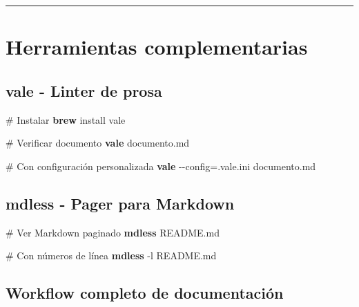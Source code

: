 \documentclass[
  11pt,
  letterpaper,
  oneside,
  openany]{scrbook}
\newenvironment{Shaded}{}{}
\newcommand{\AttributeTok}[1]{\textcolor[rgb]{0.84,0.23,0.29}{#1}}
\newcommand{\CommentTok}[1]{\textcolor[rgb]{0.42,0.45,0.49}{#1}}
\newcommand{\ExtensionTok}[1]{\textcolor[rgb]{0.84,0.23,0.29}{\textbf{#1}}}
\newcommand{\NormalTok}[1]{\textcolor[rgb]{0.14,0.16,0.18}{#1}}
\newcommand{\OperatorTok}[1]{\textcolor[rgb]{0.14,0.16,0.18}{#1}}
\begin{document}
\begin{center}\rule{0.5\linewidth}{0.5pt}\end{center}

\section{Herramientas
complementarias}\label{herramientas-complementarias-2}

\subsection{vale - Linter de prosa}\label{vale---linter-de-prosa}

\begin{Shaded}
\begin{Highlighting}[]
\CommentTok{\# Instalar}
\ExtensionTok{brew}\NormalTok{ install vale}

\CommentTok{\# Verificar documento}
\ExtensionTok{vale}\NormalTok{ documento.md}

\CommentTok{\# Con configuración personalizada}
\ExtensionTok{vale} \AttributeTok{{-}{-}config}\OperatorTok{=}\NormalTok{.vale.ini documento.md}
\end{Highlighting}
\end{Shaded}

\subsection{mdless - Pager para
Markdown}\label{mdless---pager-para-markdown}

\begin{Shaded}
\begin{Highlighting}[]
\CommentTok{\# Ver Markdown paginado}
\ExtensionTok{mdless}\NormalTok{ README.md}

\CommentTok{\# Con números de línea}
\ExtensionTok{mdless} \AttributeTok{{-}l}\NormalTok{ README.md}
\end{Highlighting}
\end{Shaded}

\subsection{Workflow completo de
documentación}\label{workflow-completo-de-documentaciuxf3n}
\end{document}
